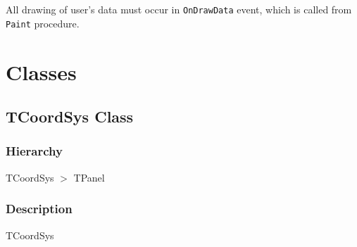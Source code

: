 \documentclass[12pt,a4paper,oneside]{report}
\newcommand{\code}[1]{\texttt{#1}}
\begin{document}
All drawing of user's data must occur in \code{OnDrawData} event, which is called from \code{Paint} procedure.  
\section{Classes}
\subsection{TCoordSys Class}\label{lmcoordsys.TCoordSys}
\subsubsection{Hierarchy}
TCoordSys {$>$} TPanel
\subsubsection{Description}
TCoordSys
\end{document}
